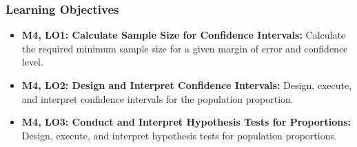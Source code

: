 \begin{frame}
    \frametitle{Learning Objectives}
    \begin{itemize}
        \item \textbf{M4, LO1: Calculate Sample Size for Confidence Intervals:} Calculate the required minimum sample size for a given margin of error and confidence level.
        \item \textbf{M4, LO2: Design and Interpret Confidence Intervals:} Design, execute, and interpret confidence intervals for the population proportion.
        \item \textbf{M4, LO3: Conduct and Interpret Hypothesis Tests for Proportions:} Design, execute, and interpret hypothesis tests for population proportions.
    \end{itemize}
\end{frame}

